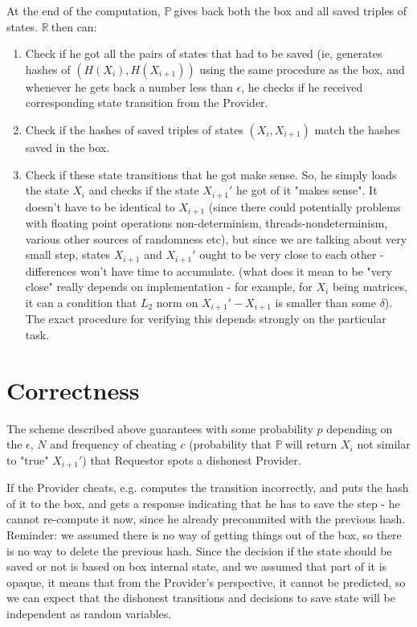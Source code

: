 \documentclass{winnower}
\newcommand{\R}{$\mathbb{R\ }$}
\newcommand{\X}{$\mathbb{P\ }$}
\begin{document}
At the end of the computation, \X gives back both the box and all saved triples of states.
\R then can:
\begin{enumerate}
\item Check if he got all the pairs of states that had to be saved (ie, generates hashes of $(H(X_i), H(X_{i+1}))$ using the same procedure as the box, and  whenever he gets back a number less than $\epsilon$, he checks if he received corresponding state transition from the Provider.
\item Check if the hashes of saved triples of states $(X_i, X_{i+1})$ match the hashes saved in the box.
\item Check if these state transitions that he got make sense. So, he simply loads the state $X_i$ and checks if the state $X_{i+1}'$ he got of it "makes sense". It doesn't have to be identical to $X_{i+1}$ (since there could potentially problems with floating point operations non-determinism, threads-nondeterminism, various other sources of randomness etc), but since we are talking about very small step, states $X_{i+1}$ and $X_{i+1}'$ ought to be very close to each other - differences won't have time to accumulate. (what does it mean to be "very close" really depends on implementation - for example, for $X_i$ being matrices, it can a condition that $L_2$ norm on $X_{i+1}' - X_{i+1}$ is smaller than some $\delta$). The exact procedure for verifying this depends strongly on the particular task. 
\end{enumerate}

\section{Correctness}
The scheme described above guarantees with some probability $p$ depending on the $\epsilon$, $N$ and frequency of cheating $c$ (probability that \X will return $X_i$ not similar to "true" $X_{i+1}'$) that Requestor spots a dishonest Provider.

If the Provider cheats, e.g. computes the transition incorrectly, and puts the hash of it to the box, and gets a response indicating that he has to save the step - he cannot re-compute it now, since he already precommited with the previous hash. Reminder: we assumed there is no way of getting things out of the box, so there is no way to delete the previous hash. Since the decision if the state should be saved or not is based on box internal state, and we assumed that part of it is opaque, it means that from the Provider's perspective, it cannot be predicted, so we can expect that the dishonest transitions and decisions to save state will be independent as random variables.
\end{document}
